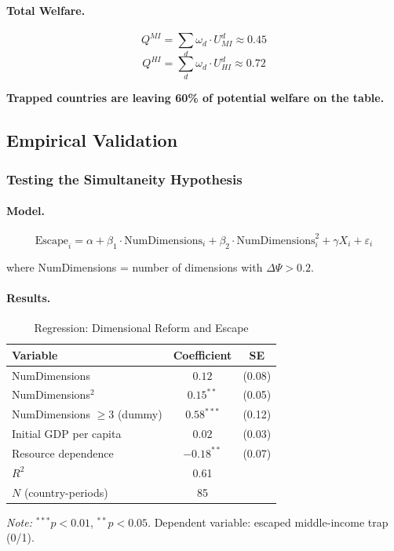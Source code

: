 \paragraph{Total Welfare.}
\begin{equation}
Q^{MI} = \sum_d \omega_d \cdot U^d_{MI} \approx 0.45
\end{equation}
\begin{equation}
Q^{HI} = \sum_d \omega_d \cdot U^d_{HI} \approx 0.72
\end{equation}

\textbf{Trapped countries are leaving 60\% of potential welfare on the table.}

\subsection{Empirical Validation}

\subsubsection{Testing the Simultaneity Hypothesis}

\paragraph{Model.}
\begin{equation}
\text{Escape}_i = \alpha + \beta_1 \cdot \text{NumDimensions}_i + \beta_2 \cdot \text{NumDimensions}^2_i + \gamma X_i + \varepsilon_i
\end{equation}

where NumDimensions = number of dimensions with $\Delta \Psi > 0.2$.

\paragraph{Results.}
\begin{table}[htbp]
\centering
\caption{Regression: Dimensional Reform and Escape}
\label{tab:escape-regression}
\begin{tabular}{@{}lcc@{}}
\toprule
\textbf{Variable} & \textbf{Coefficient} & \textbf{SE} \\
\midrule
NumDimensions & $0.12$ & (0.08) \\
NumDimensions$^2$ & $0.15^{**}$ & (0.05) \\
NumDimensions $\geq 3$ (dummy) & $0.58^{***}$ & (0.12) \\
Initial GDP per capita & $0.02$ & (0.03) \\
Resource dependence & $-0.18^{**}$ & (0.07) \\
\midrule
$R^2$ & 0.61 & \\
$N$ (country-periods) & 85 & \\
\bottomrule
\end{tabular}
\begin{flushleft}
\small\textit{Note:} $^{***}p<0.01$, $^{**}p<0.05$. Dependent variable: escaped middle-income trap (0/1).
\end{flushleft}
\end{table}

